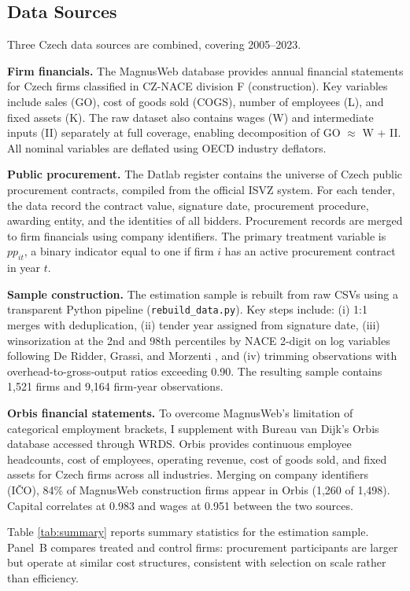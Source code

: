 \documentclass[11pt]{article}
\begin{document}
\subsection{Data Sources}\label{sec:datasources}

Three Czech data sources are combined, covering 2005--2023.

\textbf{Firm financials.} The MagnusWeb database provides annual financial statements for Czech firms classified in CZ-NACE division F (construction). Key variables include sales (GO), cost of goods sold (COGS), number of employees (L), and fixed assets (K). The raw dataset also contains wages (W) and intermediate inputs (II) separately at full coverage, enabling decomposition of GO $\approx$ W + II. All nominal variables are deflated using OECD industry deflators.

\textbf{Public procurement.} The Datlab register contains the universe of Czech public procurement contracts, compiled from the official ISVZ system. For each tender, the data record the contract value, signature date, procurement procedure, awarding entity, and the identities of all bidders. Procurement records are merged to firm financials using company identifiers. The primary treatment variable is $pp_{it}$, a binary indicator equal to one if firm $i$ has an active procurement contract in year $t$.

\textbf{Sample construction.} The estimation sample is rebuilt from raw CSVs using a transparent Python pipeline (\texttt{rebuild\_data.py}). Key steps include: (i) 1:1 merges with deduplication, (ii) tender year assigned from signature date, (iii) winsorization at the 2nd and 98th percentiles by NACE 2-digit on log variables following De Ridder, Grassi, and Morzenti \cite{DGM2026}, and (iv) trimming observations with overhead-to-gross-output ratios exceeding 0.90. The resulting sample contains 1,521 firms and 9,164 firm-year observations.

\textbf{Orbis financial statements.} To overcome MagnusWeb's limitation of categorical employment brackets, I supplement with Bureau van Dijk's Orbis database accessed through WRDS. Orbis provides continuous employee headcounts, cost of employees, operating revenue, cost of goods sold, and fixed assets for Czech firms across all industries. Merging on company identifiers (I\v{C}O), 84\% of MagnusWeb construction firms appear in Orbis (1,260 of 1,498). Capital correlates at 0.983 and wages at 0.951 between the two sources.

Table \ref{tab:summary} reports summary statistics for the estimation sample. Panel~B compares treated and control firms: procurement participants are larger but operate at similar cost structures, consistent with selection on scale rather than efficiency.
\end{document}
